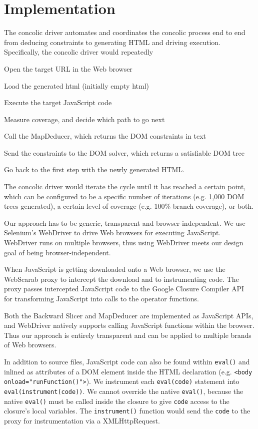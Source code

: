 \section{Implementation}
\label{impl}
The concolic driver automates and coordinates the concolic process end to end from deducing constraints to generating HTML and driving execution.  Specifically, the concolic driver would repeatedly
\begin {compactitem}
\item Open the target URL in the Web browser
\item Load the generated html (initially empty html)
\item Execute the target JavaScript code
\item Measure coverage, and decide which path to go next
\item Call the MapDeducer, which returns the DOM constraints in text
\item Send the constraints to the DOM solver, which returns a satisfiable DOM tree
\item Go back to the first step with the newly generated HTML.
\end{compactitem}
The concolic driver would iterate the cycle until it has reached a certain point, which can be configured to be a specific number of iterations (e.g. 1,000 DOM trees generated), a certain level of coverage (e.g. 100\% branch coverage), or both. 


Our approach has to be generic, transparent and browser-independent.  
We use Selenium's WebDriver\cite{webdriverjs} to drive Web browsers for executing JavaScript.  
WebDriver runs on multiple browsers, thus using WebDriver meets our design goal of being browser-independent.  

When JavaScript is getting downloaded onto a Web browser, we use the WebScarab proxy to intercept the download and to instrumenting code.  
The proxy passes intercepted JavaScript code to the Google Closure Compiler API~\cite{ClosureCompiler} for transforming JavaScript into calls to the operator functions. 

Both the Backward Slicer and MapDeducer are implemented as JavaScript APIs, and WebDriver natively supports calling JavaScript functions within the browser.  
Thus our approach is entirely transparent and can be applied to multiple brands of Web browsers.    


In addition to source files, JavaScript code can also be found within {\tt eval()} and inlined as attributes of a DOM element inside the HTML declaration (e.g. {\tt <body onload="runFunction()">}).
We instrument each {\tt eval(code)} statement into {\tt eval(instrument(code))}.  We cannot override the native {\tt eval()}, because the native {\tt eval()} must be called inside the closure to give {\tt code} access to the closure's local variables.  
The {\tt instrument()} function would send the {\tt code} to the proxy for instrumentation via a XMLHttpRequest.  

